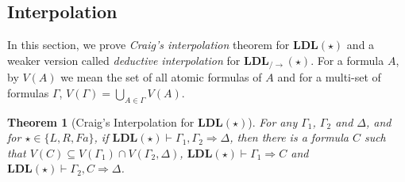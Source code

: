 \documentclass[12pt,a4paper]{article}
\theoremstyle{plain}
\newtheorem{thm}{Theorem}[section]
\theoremstyle{definition}
\begin{document}
\subsection{Interpolation}
In this section, we prove \emph{Craig's interpolation} theorem for $\mathbf{LDL}(\star)$ and a weaker version called \emph{deductive interpolation} for $\mathbf{LDL}_{/\rightarrow}(\star)$. For a formula $A$, by $V(A)$ we mean the set of all atomic formulas of $A$ and for a multi-set of formulas $\Gamma$, $V(\Gamma) = \bigcup_{A \in \Gamma} V(A)$.
\begin{thm}[Craig's Interpolation for $\mathbf{LDL}(\star)$]\label{thm:ldl-craig} For any $\Gamma_1$, $\Gamma_2$ and $\Delta$, and for $\star \in \{L, R, Fa\}$, if $\mathbf{LDL}(\star) \vdash \Gamma_1 , \Gamma_2 \Rightarrow \Delta$, then there is a formula $C$ such that $V(C) \subseteq V(\Gamma_1) \cap V(\Gamma_2 , \Delta)$, $\mathbf{LDL}(\star) \vdash \Gamma_1 \Rightarrow C$ and $\mathbf{LDL}(\star) \vdash \Gamma_2 , C \Rightarrow \Delta$.
\end{thm}
\end{document}
